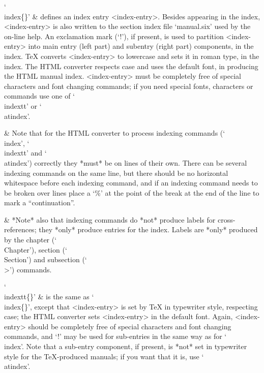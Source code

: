`\\index\{<index-entry>\}' &
    defines an index entry <index-entry>. Besides appearing in the index,
    <index-entry> is also written to the section index file  `manual.six'
    used by the on-line help. An exclamation mark (`!'), if  present,  is
    used to partition <index-entry>  into  main  entry  (left  part)  and
    subentry (right part)  components,  in  the  index.  {\TeX}  converts
    <index-entry> to lowercase and sets it in roman type, in  the  index.
    The HTML converter respects  case  and  uses  the  default  font,  in
    producing the HTML manual index.  <index-entry>  must  be  completely
    free of special characters and font changing commands;  if  you  need
    special fonts, characters or  commands  use  one  of  `\\indextt'  or
    `\\atindex'.

  & Note that for  the  HTML  converter  to  process  indexing   commands
    (`\\index', `\\indextt' and `\\atindex') correctly they *must* be  on
    lines of their own. There can be several  indexing  commands  on  the
    same line, but there should be no horizontal whitespace  before  each
    indexing command, and if an indexing command needs to be broken  over
    lines place a `\%' at the point of the break at the end of  the  line
    to mark a ``continuation''.

  & *Note* also that  indexing  commands  do  *not*  produce  labels  for
    cross-references; they *only* produce entries for the  index.  Labels
    are  *only*  produced   by   the   chapter   (`\\Chapter'),   section
    (`\\Section') and subsection (`\\>') commands.

`\\indextt\{<index-entry>\}' &
    is the same as `\\index\{<index-entry>\}', except that  <index-entry>
    is set by {\TeX} in  typewriter  style,  respecting  case;  the  HTML
    converter  sets   <index-entry>   in   the   default   font.   Again,
    <index-entry> should be completely free  of  special  characters  and
    font changing commands, and `!' may be used for  sub-entries  in  the
    same way as for  `\\index'.  Note  that  a  sub-entry  component,  if
    present, is *not* set in typewriter  style  for  the  {\TeX}-produced
    manuals; if you want that it is, use `\\atindex'.

